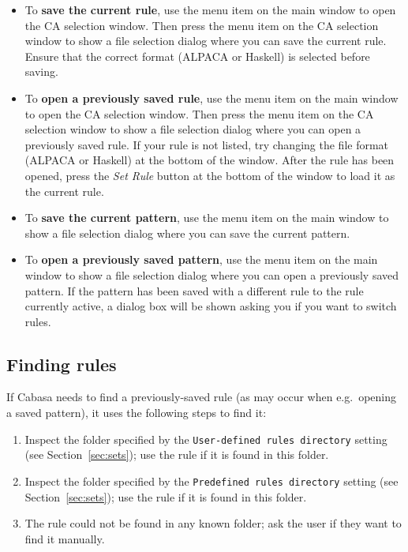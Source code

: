 \documentclass[oneside,a4paper]{memoir}
\begin{document}
\begin{itemize}
\item To \textbf{save the current rule}, use the  menu item on the main window to open the CA selection window.
  Then press the  menu item on the CA selection window to show a file selection dialog where you can save the current rule.
  Ensure that the correct format (ALPACA or Haskell) is selected before saving.
\item To \textbf{open a previously saved rule}, use the  menu item on the main window to open the CA selection window.
  Then press the  menu item on the CA selection window to show a file selection dialog where you can open a previously saved rule.
  If your rule is not listed, try changing the file format (ALPACA or Haskell) at the bottom of the window.
  After the rule has been opened, press the \textit{Set Rule} button at the bottom of the window to load it as the current rule.
\item To \textbf{save the current pattern}, use the  menu item on the main window to show a file selection dialog where you can save the current pattern.
\item To \textbf{open a previously saved pattern}, use the  menu item on the main window to show a file selection dialog where you can open a previously saved pattern.
  If the pattern has been saved with a different rule to the rule currently active,
    a dialog box will be shown asking you if you want to switch rules.
\end{itemize}

\subsection{Finding rules}
\label{sec:findrs}

If Cabasa needs to find a previously-saved rule (as may occur when e.g.\ opening a saved pattern),
  it uses the following steps to find it:

\begin{enumerate}
\item Inspect the folder specified by the \texttt{User-defined rules directory} setting (see Section~\ref{sec:sets});
  use the rule if it is found in this folder.
\item Inspect the folder specified by the \texttt{Predefined rules directory} setting (see Section~\ref{sec:sets});
  use the rule if it is found in this folder.
\item The rule could not be found in any known folder; ask the user if they want to find it manually.
\end{enumerate}
\end{document}
